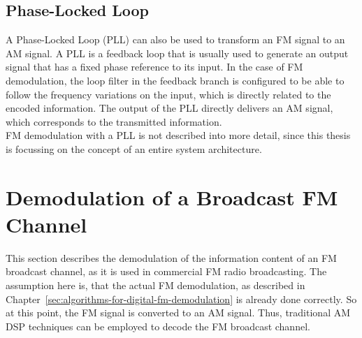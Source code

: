 \subsection{Phase-Locked Loop}

A Phase-Locked Loop (PLL) can also be used to transform an FM signal to an AM signal.
A PLL is a feedback loop that is usually used to generate an output signal that has a fixed phase reference to its input.
In the case of FM demodulation, the loop filter in the feedback branch is configured to be able to follow the frequency variations on the input, which is directly related to the encoded information.
The output of the PLL directly delivers an AM signal, which corresponds to the transmitted information. \cite{SchnyderHaller2002}\\

FM demodulation with a PLL is not described into more detail, since this thesis is focussing on the concept of an entire system architecture.

\section{Demodulation of a Broadcast FM Channel}
\label{sec:demodulation-of-a-broadcast-fm-channel}

This section describes the demodulation of the information content of an FM broadcast channel, as it is used in commercial FM radio broadcasting.
The assumption here is, that the actual FM demodulation, as described in Chapter~\ref{sec:algorithms-for-digital-fm-demodulation} is already done correctly.
So at this point, the FM signal is converted to an AM signal.
Thus, traditional AM DSP techniques can be employed to decode the FM broadcast channel.\\


